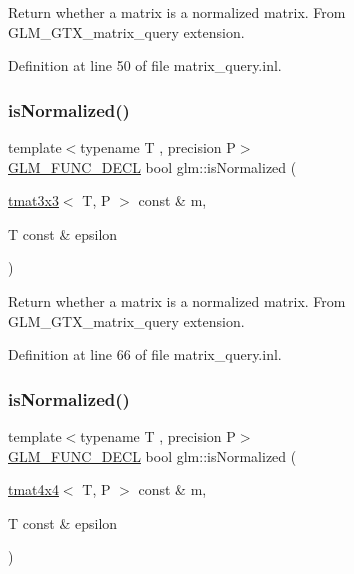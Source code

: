 Return whether a matrix is a normalized matrix. From G\+L\+M\+\_\+\+G\+T\+X\+\_\+matrix\+\_\+query extension. 

Definition at line 50 of file matrix\+\_\+query.\+inl.

\mbox{\label{group__gtx__matrix__query_ga351bcc8d485d329b78cfa875e084964d}} 
\subsubsection{\texorpdfstring{isNormalized()}{isNormalized()}\hspace{0.1cm}{\footnotesize\ttfamily [2/3]}}
{\footnotesize\ttfamily template$<$typename T , precision P$>$ \\
\mbox{\hyperlink{setup_8hpp_ab2d052de21a70539923e9bcbf6e83a51}{G\+L\+M\+\_\+\+F\+U\+N\+C\+\_\+\+D\+E\+CL}} bool glm\+::is\+Normalized (\begin{DoxyParamCaption}\item[{\mbox{\hyperlink{structglm_1_1tmat3x3}{tmat3x3}}$<$ T, P $>$ const \&}]{m,  }\item[{T const \&}]{epsilon }\end{DoxyParamCaption})}

Return whether a matrix is a normalized matrix. From G\+L\+M\+\_\+\+G\+T\+X\+\_\+matrix\+\_\+query extension. 

Definition at line 66 of file matrix\+\_\+query.\+inl.

\mbox{\label{group__gtx__matrix__query_ga934b673ec0e16d79eca0ca9dbb5d6d8b}} 
\subsubsection{\texorpdfstring{isNormalized()}{isNormalized()}\hspace{0.1cm}{\footnotesize\ttfamily [3/3]}}
{\footnotesize\ttfamily template$<$typename T , precision P$>$ \\
\mbox{\hyperlink{setup_8hpp_ab2d052de21a70539923e9bcbf6e83a51}{G\+L\+M\+\_\+\+F\+U\+N\+C\+\_\+\+D\+E\+CL}} bool glm\+::is\+Normalized (\begin{DoxyParamCaption}\item[{\mbox{\hyperlink{structglm_1_1tmat4x4}{tmat4x4}}$<$ T, P $>$ const \&}]{m,  }\item[{T const \&}]{epsilon }\end{DoxyParamCaption})}

